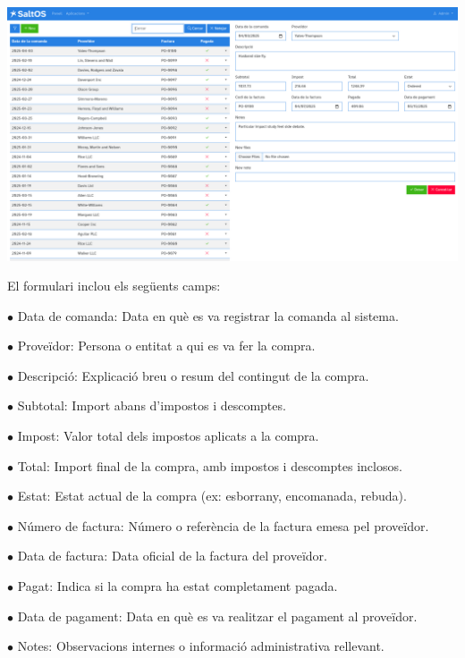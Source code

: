 \documentclass[a4paper]{article}
\begin{document}
\begin{center}\includegraphics[width=1\textwidth]{../ujest/snaps/test-screenshots-js-screenshots-purchases-purchase-edit-100-ca-es-1-snap.png}\end{center}

El formulari inclou els següents camps:

\begin{compactitem}
\item[\color{myblue}$\bullet$] Data de comanda: Data en què es va registrar la comanda al sistema.
\item[\color{myblue}$\bullet$] Proveïdor: Persona o entitat a qui es va fer la compra.
\item[\color{myblue}$\bullet$] Descripció: Explicació breu o resum del contingut de la compra.
\item[\color{myblue}$\bullet$] Subtotal: Import abans d'impostos i descomptes.
\item[\color{myblue}$\bullet$] Impost: Valor total dels impostos aplicats a la compra.
\item[\color{myblue}$\bullet$] Total: Import final de la compra, amb impostos i descomptes inclosos.
\item[\color{myblue}$\bullet$] Estat: Estat actual de la compra (ex: esborrany, encomanada, rebuda).
\item[\color{myblue}$\bullet$] Número de factura: Número o referència de la factura emesa pel proveïdor.
\item[\color{myblue}$\bullet$] Data de factura: Data oficial de la factura del proveïdor.
\item[\color{myblue}$\bullet$] Pagat: Indica si la compra ha estat completament pagada.
\item[\color{myblue}$\bullet$] Data de pagament: Data en què es va realitzar el pagament al proveïdor.
\item[\color{myblue}$\bullet$] Notes: Observacions internes o informació administrativa rellevant.
\end{compactitem}
\end{document}
